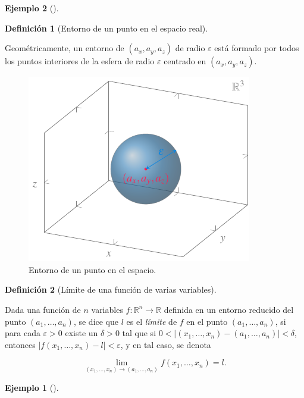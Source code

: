 \documentclass[
  a4paper,
]{scrreport}
\theoremstyle{definition}
\newtheorem{example}{Ejemplo}[chapter]
\theoremstyle{plain}
\theoremstyle{definition}
\newtheorem{definition}{Definición}[chapter]
\theoremstyle{definition}
\theoremstyle{plain}
\theoremstyle{plain}
\theoremstyle{remark}
\begin{document}
\begin{example}[]
\begin{definition}[Entorno de un punto en el espacio
real]
\end{definition}

Geométricamente, un entorno de \((a_x,a_y,a_z)\) de radio
\(\varepsilon\) está formado por todos los puntos interiores de la
esfera de radio \(\varepsilon\) centrado en \((a_x,a_y,a_z)\).

\begin{figure}[H]

{\centering \includegraphics{img/derivadas-funciones-varias-variables/entorno-punto-espacio.pdf}

}

\caption{Entorno de un punto en el espacio.}

\end{figure}%

\begin{definition}[Límite de una función de varias
variables]\protect\hypertarget{def-limite-funcion-varias-variables}{}\label{def-limite-funcion-varias-variables}

Dada una función de \(n\) variables
\(f:\mathbb{R}^n\rightarrow \mathbb{R}\) definida en un entorno reducido
del punto \((a_1, \ldots, a_n)\), se dice que \(l\) es el \emph{límite}
de \(f\) en el punto \((a_1, \ldots, a_n)\), si para cada
\(\varepsilon>0\) existe un \(\delta>0\) tal que si
\(0<|(x_1,\ldots,x_n)-(a_1,\ldots,a_n)|<\delta\), entonces
\(|f(x_1,\ldots,x_n)-l|<\varepsilon\), y en tal caso, se denota

\[
\lim_{(x_1,\ldots,x_n)\rightarrow (a_1,\ldots,a_n)}f(x_1,\ldots,x_n) = l.
\]

\end{definition}

\begin{example}[]\protect\hypertarget{exm-limite-funcion-dos-variables}{}\label{exm-limite-funcion-dos-variables}


\end{example}
\end{example}
\end{document}
